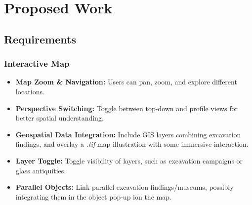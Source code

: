 
%

\chapter{Proposed Work}
\label{cha:proposed_work}

\section{Requirements}

\subsection*{Interactive Map}
\begin{itemize}
    \item \textbf{Map Zoom \& Navigation:} Users can pan, zoom, and explore different locations.
    \item \textbf{Perspective Switching:} Toggle between top-down and profile views for better spatial understanding.
    \item \textbf{Geospatial Data Integration:} Include \gls{GIS} layers combining excavation findings, and overlay a \textit{.tif} map illustration with some immersive interaction.
    \item \textbf{Layer Toggle:} Toggle visibility of layers, such as excavation campaigns or glass antiquities.
    \item \textbf{Parallel Objects:} Link parallel excavation findings/museums, possibly integrating them in the object pop-up ion the map.
\end{itemize}

